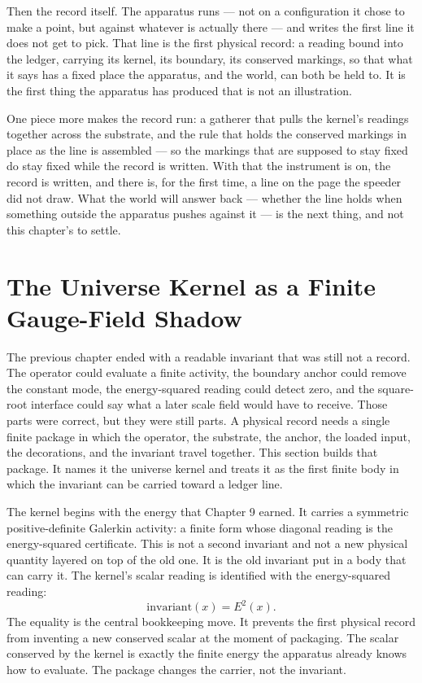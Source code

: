 Then the record itself. The apparatus runs --- not on a configuration it chose to make a point, but against whatever is actually there --- and writes the first line it does not get to pick. That line is the first physical record: a reading bound into the ledger, carrying its kernel, its boundary, its conserved markings, so that what it says has a fixed place the apparatus, and the world, can both be held to. It is the first thing the apparatus has produced that is not an illustration.

One piece more makes the record run: a gatherer that pulls the kernel's readings together across the substrate, and the rule that holds the conserved markings in place as the line is assembled --- so the markings that are supposed to stay fixed do stay fixed while the record is written. With that the instrument is on, the record is written, and there is, for the first time, a line on the page the speeder did not draw. What the world will answer back --- whether the line holds when something outside the apparatus pushes against it --- is the next thing, and not this chapter's to settle.

\section{The Universe Kernel as a Finite Gauge-Field Shadow}

The previous chapter ended with a readable invariant that was still not a
record. The operator could evaluate a finite activity, the boundary anchor could
remove the constant mode, the energy-squared reading could detect zero, and the
square-root interface could say what a later scale field would have to receive.
Those parts were correct, but they were still parts. A physical record needs a
single finite package in which the operator, the substrate, the anchor, the
loaded input, the decorations, and the invariant travel together. This section
builds that package. It names it the universe kernel and treats it as the first
finite body in which the invariant can be carried toward a ledger line.

The kernel begins with the energy that Chapter 9 earned. It carries a symmetric
positive-definite Galerkin activity: a finite form whose diagonal reading is the
energy-squared certificate. This is not a second invariant and not a new physical
quantity layered on top of the old one. It is the old invariant put in a body that
can carry it. The kernel's scalar reading is identified with the energy-squared
reading:
\[
  \mathrm{invariant}(x) = E^2(x).
\]
The equality is the central bookkeeping move. It prevents the first physical
record from inventing a new conserved scalar at the moment of packaging. The
scalar conserved by the kernel is exactly the finite energy the apparatus already
knows how to evaluate. The package changes the carrier, not the invariant.

